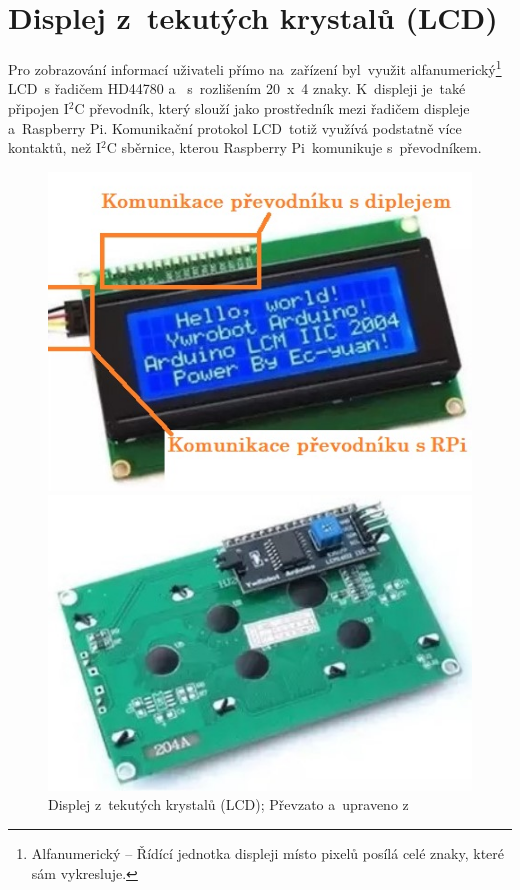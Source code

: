 \section{Displej z~tekutých krystalů (LCD)}
Pro zobrazování informací uživateli přímo na~zařízení  byl~využit alfanumerický\footnote{Alfanumerický -- Řídící jednotka displeji místo pixelů posílá celé znaky, které sám vykresluje.}  LCD~s řadičem HD44780 a ~s~rozlišením 20~x~4 znaky.  K~displeji je~také připojen I$^{2}$C převodník, který slouží jako prostředník mezi řadičem displeje a~Raspberry Pi.
Komunikační protokol  LCD~totiž využívá podstatně více kontaktů, než I$^{2}$C sběrnice, kterou Raspberry Pi~komunikuje  s~převodníkem.

\begin{figure}[htb]
  \centering
  \begin{minipage}{0.45\textwidth}
    \centering
    \includegraphics[width=1\textwidth]{img/LCD_front.jpg} %
    \caption{\label{fig:LCD_front} Displej z~tekutých krystalů (LCD); Převzato a~upraveno z~\cite{laskakit-LCD}}
  \end{minipage}\hfill
  \begin{minipage}{0.45\textwidth}
    \centering
    \includegraphics[width=1\textwidth]{img/LCD_back.jpg} %

\end{minipage}
\end{figure}
